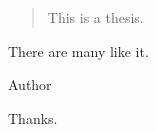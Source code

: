 \begin{abstract}
This is a thesis.
\end{abstract}


\begin{declaration}
There are many like it.

\vspace*{1cm}
\begin{flushright}
Author
\end{flushright}
\end{declaration}




\begin{acknowledgements}
Thanks.

\end{acknowledgements}


\tableofcontents


